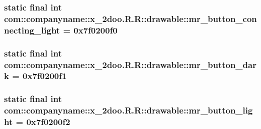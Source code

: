 \hypertarget{classcom_1_1companyname_1_1x__2doo_1_1_r_1_1drawable_275ffab31bc615f5e8f997338a593559}{
\subsubsection[{mr\_\-button\_\-connecting\_\-light}]{\setlength{\rightskip}{0pt plus 5cm}static final int com::companyname::x\_\-2doo.R.R::drawable::mr\_\-button\_\-connecting\_\-light = 0x7f0200f0}}
\label{classcom_1_1companyname_1_1x__2doo_1_1_r_1_1drawable_275ffab31bc615f5e8f997338a593559}


\hypertarget{classcom_1_1companyname_1_1x__2doo_1_1_r_1_1drawable_78a957502f09046a70d3ae4e9bf1f1be}{
\subsubsection[{mr\_\-button\_\-dark}]{\setlength{\rightskip}{0pt plus 5cm}static final int com::companyname::x\_\-2doo.R.R::drawable::mr\_\-button\_\-dark = 0x7f0200f1}}
\label{classcom_1_1companyname_1_1x__2doo_1_1_r_1_1drawable_78a957502f09046a70d3ae4e9bf1f1be}


\hypertarget{classcom_1_1companyname_1_1x__2doo_1_1_r_1_1drawable_6e834cb965b9b74c1cd40b7b4eb7e6ce}{
\subsubsection[{mr\_\-button\_\-light}]{\setlength{\rightskip}{0pt plus 5cm}static final int com::companyname::x\_\-2doo.R.R::drawable::mr\_\-button\_\-light = 0x7f0200f2}}
\label{classcom_1_1companyname_1_1x__2doo_1_1_r_1_1drawable_6e834cb965b9b74c1cd40b7b4eb7e6ce}


